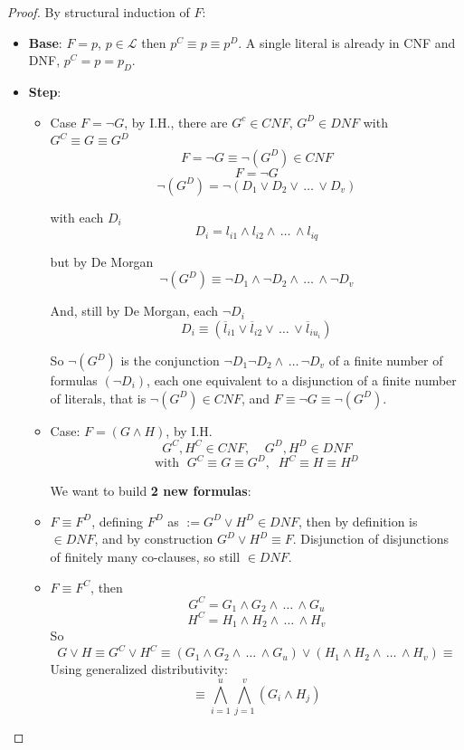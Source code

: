 	\begin{proof}
		By structural induction of $F$:
		\begin{itemize}
			\item \textbf{Base}: $F = p$, $p \in \mathcal{L}$ then $p^C \equiv p \equiv p^D$. A single literal is already in CNF and DNF, $p^C = p = p_D$.\\

			\item \textbf{Step}:
			\begin{itemize}
			\item Case $F = \neg G$, by I.H., there are $G^c \in CNF$, $G^D \in DNF$ with $G^C \equiv G \equiv G^D$
			$$ F = \neg G \equiv \neg(G^D) \in CNF $$
			$$ F = \neg G $$
			$$ \neg (G^D) = \neg (D_1 \vee D_2 \vee \, \dots \, \vee D_v) $$

			with each $D_i$
			$$ D_i = l_{i1} \wedge l_{i2} \wedge \, \dots \, \wedge l_{iq}$$

			but by De Morgan
			$$ \neg (G^D) \equiv \neg D_1 \wedge \neg D_2 \wedge \, \dots \, \wedge \neg D_v $$

			And, still by De Morgan, each $\neg D_i$
			$$ D_i \equiv (\overline{l}_{i1} \vee \overline{l}_{i2} \vee \, \dots \, \vee \overline{l}_{iu_i}) $$

		So $\neg (G^D)$ is the conjunction $\neg D_1 \neg D_2 \wedge \, \dots \, \neg D_v$ of a finite number of formulas $(\neg D_i)$, each one equivalent to a disjunction of a finite number of literals, that is $\neg (G^D) \in CNF$, and $F \equiv \neg G \equiv \neg (G^D)$.\\
			\end{itemize}

		\begin{itemize}
		\item Case: $F = (G \wedge H)$, by I.H.
		$$  G^C, H^C \in CNF, \;\;\;\; G^D, H^D \in DNF $$
		$$ \text{with } \; G^C \equiv G \equiv G^D, \;\; H^C \equiv H \equiv H^D $$

		We want to build \textbf{2 new formulas}:
			\item $F \equiv F^D$, defining $F^D$ as  $:= G^D \vee H^D \in DNF$, then by definition is $ \in DNF$, and by construction $G^D \vee H^D \equiv F$. Disjunction of disjunctions of finitely many co-clauses, so still $\in DNF$.\\

			\item $F \equiv F^C$, then
			$$ G^C = G_1 \wedge G_2 \wedge \, \dots \, \wedge G_u $$
			$$ H^C = H_1 \wedge H_2 \wedge \, \dots \, \wedge H_v $$
			So
			$$ G \vee H \equiv G^C \vee H^C \equiv (G_1 \wedge G_2 \wedge \, \dots \, \wedge G_u) \vee (H_1 \wedge H_2 \wedge \, \dots \, \wedge H_v) \equiv $$
			Using generalized distributivity:
			$$ \equiv \bigwedge_{i=1}^u \bigwedge_{j=1}^v (G_i \wedge H_j) $$


\end{itemize}
\end{itemize}
\end{proof}
